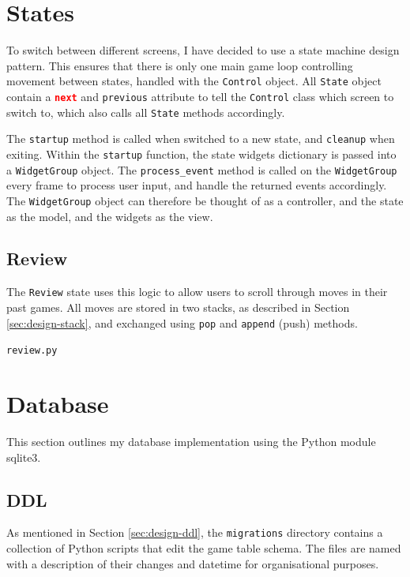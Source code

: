 \documentclass[../main/main.tex]{subfiles}
\begin{document}
\section{States}
To switch between different screens, I have decided to use a state machine design pattern. This ensures that there is only one main game loop controlling movement between states, handled with the \lstinline{Control} object. All \lstinline{State} object contain a \lstinline[language=json]{next} and \lstinline{previous} attribute to tell the \lstinline{Control} class which screen to switch to, which also calls all \lstinline{State} methods accordingly.

The \lstinline{startup} method is called when switched to a new state, and \lstinline{cleanup} when exiting. Within the \lstinline{startup} function, the state widgets dictionary is passed into a \lstinline{WidgetGroup} object. The \lstinline{process_event} method is called on the \lstinline{WidgetGroup} every frame to process user input, and handle the returned events accordingly. The \lstinline{WidgetGroup} object can therefore be thought of as a controller, and the state as the model, and the widgets as the view.

\subsection{Review}
\label{sec:review}
The \lstinline{Review} state uses this logic to allow users to scroll through moves in their past games. All moves are stored in two stacks, as described in Section \ref{sec:design-stack}, and exchanged using \lstinline{pop} and \lstinline{append} (push) methods.

\noindent\verb|review.py|


\section{Database}
This section outlines my database implementation using the Python module sqlite3.

\subsection{DDL}
\label{sec:migrations}
As mentioned in Section \ref{sec:design-ddl}, the \lstinline{migrations} directory contains a collection of Python scripts that edit the game table schema. The files are named with a description of their changes and datetime for organisational purposes.
\end{document}
